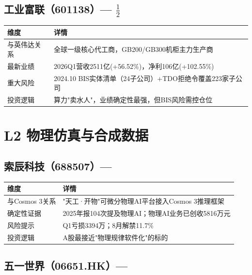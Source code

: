 \subsection{工业富联（601138）--- \starthree{}$\frac{1}{2}$}

\begin{table}[H]
\centering\small
\renewcommand{\arraystretch}{1.3}
\begin{tabularx}{\textwidth}{l X}
\toprule
\textbf{维度} & \textbf{详情} \\
\midrule
与英伟达关系 & 全球一级核心代工商，GB200/GB300机柜主力生产商 \\
最新业绩 & 2026Q1营收2511亿(+56.52\%)，净利106亿(+102.55\%) \\
重大风险 & \textcolor{riskred}{2024.10 BIS实体清单（24子公司）+TDO拒绝令覆盖223家子公司} \\
投资逻辑 & 算力"卖水人"，业绩确定性最强，但BIS风险需控仓位 \\
\bottomrule
\end{tabularx}
\end{table}

\section{L2 物理仿真与合成数据}

\subsection{索辰科技（688507）--- \starfive{}}

\begin{table}[H]
\centering\small
\renewcommand{\arraystretch}{1.3}
\begin{tabularx}{\textwidth}{l X}
\toprule
\textbf{维度} & \textbf{详情} \\
\midrule
与Cosmos 3关系 & "天工·开物"可微分物理AI平台接入Cosmos 3推理框架 \\
确定性证据 & 2025年报104次提及物理AI；物理AI业务已创收5816万元 \\
风险提示 & Q1亏损3394万；8月解禁11.7\% \\
投资逻辑 & A股最接近"物理规律软件化"的标的 \\
\bottomrule
\end{tabularx}
\end{table}

\subsection{五一世界（06651.HK）--- \starfive{}}


